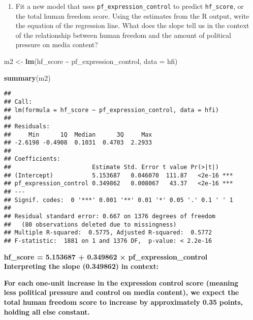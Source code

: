 \documentclass[
]{article}
\newenvironment{Shaded}{\begin{snugshade}}{\end{snugshade}}
\newcommand{\AttributeTok}[1]{\textcolor[rgb]{0.13,0.29,0.53}{#1}}
\newcommand{\FunctionTok}[1]{\textcolor[rgb]{0.13,0.29,0.53}{\textbf{#1}}}
\newcommand{\NormalTok}[1]{#1}
\newcommand{\OtherTok}[1]{\textcolor[rgb]{0.56,0.35,0.01}{#1}}
\newcommand{\SpecialCharTok}[1]{\textcolor[rgb]{0.81,0.36,0.00}{\textbf{#1}}}
\providecommand{\tightlist}{%
  \setlength{\itemsep}{0pt}\setlength{\parskip}{0pt}}
\begin{document}
\begin{enumerate}
\def\labelenumi{\arabic{enumi}.}
\setcounter{enumi}{4}
\tightlist
\item
  Fit a new model that uses \texttt{pf\_expression\_control} to predict
  \texttt{hf\_score}, or the total human freedom score. Using the
  estimates from the R output, write the equation of the regression
  line. What does the slope tell us in the context of the relationship
  between human freedom and the amount of political pressure on media
  content?
\end{enumerate}

\begin{Shaded}
\begin{Highlighting}[]
\NormalTok{m2 }\OtherTok{\textless{}{-}} \FunctionTok{lm}\NormalTok{(hf\_score }\SpecialCharTok{\textasciitilde{}}\NormalTok{ pf\_expression\_control, }\AttributeTok{data =}\NormalTok{ hfi)}
\end{Highlighting}
\end{Shaded}

\begin{Shaded}
\begin{Highlighting}[]
\FunctionTok{summary}\NormalTok{(m2)}
\end{Highlighting}
\end{Shaded}

\begin{verbatim}
## 
## Call:
## lm(formula = hf_score ~ pf_expression_control, data = hfi)
## 
## Residuals:
##     Min      1Q  Median      3Q     Max 
## -2.6198 -0.4908  0.1031  0.4703  2.2933 
## 
## Coefficients:
##                       Estimate Std. Error t value Pr(>|t|)    
## (Intercept)           5.153687   0.046070  111.87   <2e-16 ***
## pf_expression_control 0.349862   0.008067   43.37   <2e-16 ***
## ---
## Signif. codes:  0 '***' 0.001 '**' 0.01 '*' 0.05 '.' 0.1 ' ' 1
## 
## Residual standard error: 0.667 on 1376 degrees of freedom
##   (80 observations deleted due to missingness)
## Multiple R-squared:  0.5775, Adjusted R-squared:  0.5772 
## F-statistic:  1881 on 1 and 1376 DF,  p-value: < 2.2e-16
\end{verbatim}

\textbf{hf\_score = 5.153687 + 0.349862 × pf\_expression\_control
Interpreting the slope (0.349862) in context:}

\textbf{For each one-unit increase in the expression control score
(meaning less political pressure and control on media content), we
expect the total human freedom score to increase by approximately 0.35
points, holding all else constant.}
\end{document}
